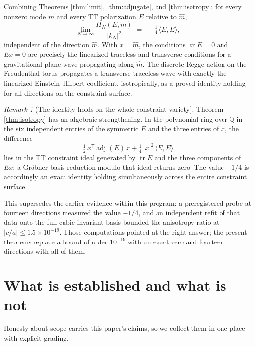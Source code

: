 \documentclass[11pt]{article}
\theoremstyle{definition}
\theoremstyle{remark}
\newtheorem{remark}[theorem]{Remark}
\DeclareMathOperator{\adjE}{adj}
\DeclareMathOperator{\tr}{tr}
\newcommand{\trans}{\mathsf{T}}
\begin{document}
Combining Theorems \ref{thm:limit}, \ref{thm:adjugate}, and \ref{thm:isotropy}: for every nonzero mode $m$ and every TT polarization $E$ relative to $\hat m$,
\begin{equation}
\lim_{N\to\infty}\frac{H_N(E,m)}{|k_N|^{2}} \;=\; -\tfrac14\,\langle E,E\rangle,
\end{equation}
independent of the direction $\hat m$. With $x = \hat m$, the conditions $\tr E = 0$ and $Ex = 0$ are precisely the linearized traceless and transverse conditions for a gravitational plane wave propagating along $\hat m$. The discrete Regge action on the Freudenthal torus propagates a transverse-traceless wave with exactly the linearized Einstein--Hilbert coefficient, isotropically, as a proved identity holding for all directions on the constraint surface.

\begin{remark}[The identity holds on the whole constraint variety]
Theorem \ref{thm:isotropy} has an algebraic strengthening. In the polynomial ring over $\mathbb{Q}$ in the six independent entries of the symmetric $E$ and the three entries of $x$, the difference
\[
\tfrac12\,x^{\trans}\adjE(E)\,x + \tfrac14\,|x|^2\,\langle E,E\rangle
\]
lies in the TT constraint ideal generated by $\tr E$ and the three components of $Ex$: a Gr\"obner-basis reduction modulo that ideal returns zero. The value $-1/4$ is accordingly an exact identity holding simultaneously across the entire constraint surface.
\end{remark}

This supersedes the earlier evidence within this program: a preregistered probe at fourteen directions measured the value $-1/4$, and an independent refit of that data onto the full cubic-invariant basis bounded the anisotropy ratio at $|c/a|\le 1.5\times 10^{-19}$. Those computations pointed at the right answer; the present theorems replace a bound of order $10^{-19}$ with an exact zero and fourteen directions with all of them.

\section{What is established and what is not}
\label{sec:scope}

Honesty about scope carries this paper's claims, so we collect them in one place with explicit grading.
\end{document}
